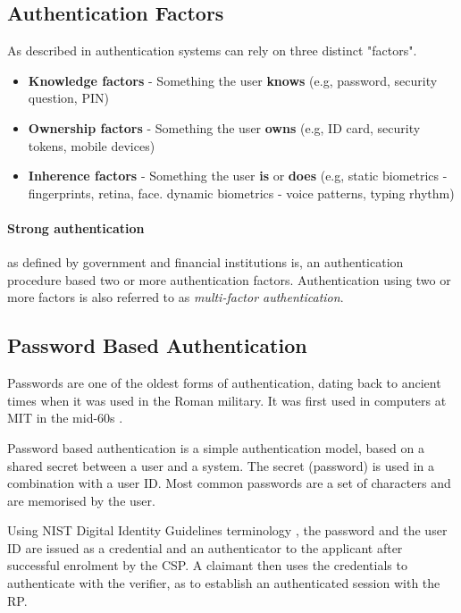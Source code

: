\subsection{Authentication Factors}

As described in \cite{council2005authentication} authentication systems can rely on three distinct "factors".

\begin{itemize}
	\item \textbf{Knowledge factors} - Something the user \textbf{knows} (e.g, password, security question, PIN)
	\item \textbf{Ownership factors} - Something the user \textbf{owns} (e.g, ID card, security tokens, mobile devices)
	\item \textbf{Inherence factors} - Something the user \textbf{is} or \textbf{does} (e.g, static biometrics - fingerprints, retina, face. dynamic biometrics - voice patterns, typing rhythm)
\end{itemize}

\paragraph{Strong authentication} as defined by government and financial institutions is, an authentication procedure based two or more authentication factors. Authentication using two or more factors is also referred to as \textit{multi-factor authentication}. %

\subsection{Password Based Authentication}

Passwords are one of the oldest forms of authentication, dating back to ancient times when it was used in the Roman military. It was first used in computers at MIT in the mid-60s \cite{mcmillan2012password}.

Password based authentication is a simple authentication model, based on a shared secret between a user and a system. The secret (password) is used in a combination with a user ID. Most common passwords are a set of characters and are memorised by the user.

Using NIST Digital Identity Guidelines terminology \cite{grassi2017}, the password and the user ID are issued as a credential and an authenticator to the applicant after successful enrolment by the CSP.
A claimant then uses the credentials to authenticate with the verifier, as to establish an authenticated session with the RP.


